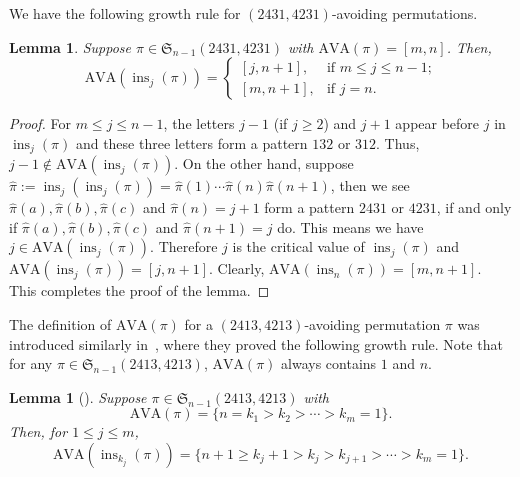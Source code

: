 \documentclass[12pt]{amsart}
\numberwithin{equation}{section}
\theoremstyle{plain}
\newtheorem{lemma}[theorem]{Lemma}
\theoremstyle{definition}
\def\S{\mathfrak{S}}
\def\ins{\operatorname{ins}}
\def\AVA{\mathrm{AVA}}
\begin{document}
We have the following growth rule for $(2431,4231)$-avoiding permutations. 
\begin{lemma}\label{insert:2431}Suppose $\pi\in\S_{n-1}(2431,4231)$ with 
$\AVA(\pi)=[m,n]$.
Then, 
$$
\AVA(\ins_j(\pi))=
\begin{cases}
[j,n+1], & \text{if $m\leq j\leq n-1$;}\\
[m,n+1], & \text{if $j=n$.} 
\end{cases}
$$
\end{lemma}
\begin{proof}
For  $m\leq j\leq n-1$, the letters $j-1$ (if $j\ge 2$) and $j+1$ appear before $j$ in $\ins_j(\pi)$ and these three letters form a pattern $132$ or $312$. Thus, $j-1\notin\AVA(\ins_j(\pi))$. On the other hand, suppose $\hat\pi:=\ins_j(\ins_j(\pi))=\hat\pi(1)\cdots\hat\pi(n)\hat\pi(n+1)$, then we see $\hat\pi(a),\hat\pi(b),\hat\pi(c)$ and $\hat\pi(n)=j+1$ form a pattern $2431$ or $4231$, if and only if $\hat\pi(a),\hat\pi(b),\hat\pi(c)$ and $\hat\pi(n+1)=j$ do. This means we have $j\in\AVA(\ins_j(\pi))$. Therefore $j$ is the critical value of $\ins_j(\pi)$ and $\AVA(\ins_j(\pi))=[j,n+1]$. Clearly, $\AVA(\ins_n(\pi))=[m,n+1]$. This completes the proof of the lemma. 
\end{proof}


The definition of $\AVA(\pi)$ for a $(2413,4213)$-avoiding permutation $\pi$ was introduced similarly in~\cite{LK}, where they proved the following growth rule. Note that for any $\pi\in\S_{n-1}(2413,4213)$, $\AVA(\pi)$ always contains $1$ and $n$.
\begin{lemma}[]
\label{insert:2413}Suppose $\pi\in\S_{n-1}(2413,4213)$ with 
$$
\AVA(\pi)=\{n=k_1>k_2>\cdots>k_m=1\}.
$$
Then, for  $1\leq j\leq m$,
$$
\AVA(\ins_{k_j}(\pi))=\{n+1\geq k_j+1>k_j>k_{j+1}>\cdots>k_m=1\}.
$$
\end{lemma}
 
\end{document}

